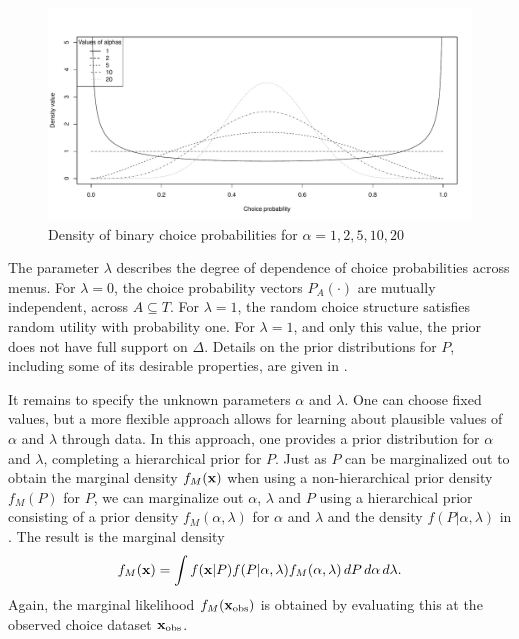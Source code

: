 \documentclass[11pt,letter]{article}
\newcommand{\menus}{menus}
\begin{document}
\begin{figure}
	\begin{center}
	\includegraphics[width=15cm]{Figures/bcp.pdf}
	\caption{Density of binary choice probabilities for $\alpha = 1, 2, 5, 10, 20$}\label{f:bcp}
	\end{center}
\end{figure}

The parameter $\lambda$ describes the degree of dependence of choice probabilities across \menus{}.
For $\lambda = 0$, the choice probability vectors $P_A(\cdot)$ are mutually independent, across $A \subseteq T$.
For $\lambda = 1$, the random choice structure satisfies random utility with probability one.
For $\lambda = 1$, and only this value, the prior does not have full support on $\Delta$.
Details on the prior distributions for $P$, including some of its desirable properties, are given in .

It remains to specify the unknown parameters $\alpha$ and $\lambda$.
One can choose fixed values, but a more flexible approach allows for learning about plausible values of $\alpha$ and $\lambda$ through data.
In this approach, one provides a prior distribution for $\alpha$ and $\lambda$, completing a hierarchical prior for $P$.
Just as $P$ can be marginalized out to obtain the marginal density $f_M({\bf x})$ when using a non-hierarchical prior density $f_M(P)$ for $P$, we can marginalize out $\alpha$, $\lambda$ and $P$ using a hierarchical prior consisting of a prior density $f_M(\alpha,\lambda)$ for $\alpha$ and $\lambda$ and the density $f(P|\alpha,\lambda)$ in .
The result is the marginal density
\[
  f_M({\bf x}) = \int f({\bf x}|P) f(P|\alpha,\lambda) f_M(\alpha,\lambda) \, dP\, d\alpha\, d\lambda.
\]
Again, the marginal likelihood $f_M({\bf x}_{\mathrm{obs}})$ is obtained by evaluating this at the observed choice dataset ${\bf x}_{\mathrm{obs}}$.
\end{document}
